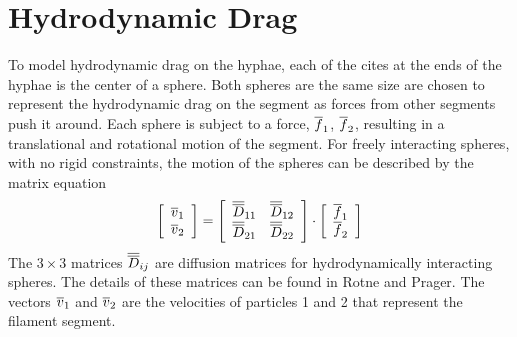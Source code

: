 \documentclass[12pt]{article}
\begin{document}
\section{Hydrodynamic Drag}
To model hydrodynamic drag on the hyphae, each of the cites at the ends of the
hyphae is the center of a sphere. Both spheres are the same size
are chosen to represent
the hydrodynamic drag on the segment as forces from other segments push
it around. Each sphere is subject to a force, $\overline{f}_1$, $\overline{f}_2$, resulting in
a translational and rotational motion of the segment. For freely interacting
spheres, with no rigid constraints, the motion of the spheres can be described
by the matrix equation
\[
\left[\begin{array}{c}\overline{v}_1 \\ \overline{v}_2 \end{array}\right] =
\left[\begin{array}{cc} \overline{\overline{D}}_{11} & \overline{\overline{D}}_{12} \\
\overline{\overline{D}}_{21} & \overline{\overline{D}}_{22} \end{array}\right]
\cdot\left[\begin{array}{c} \overline{f}_1 \\ \overline{f}_2 \end{array}\right]
\]
The $3\times 3$ matrices $\overline{\overline{D}}_{ij}$ are diffusion matrices for hydrodynamically
interacting spheres. The details of these matrices can be found in Rotne and
Prager\cite{RP}. The vectors $\overline{v}_1$ and $\overline{v}_2$ are the
velocities of particles 1 and 2 that represent the filament segment.
\end{document}
